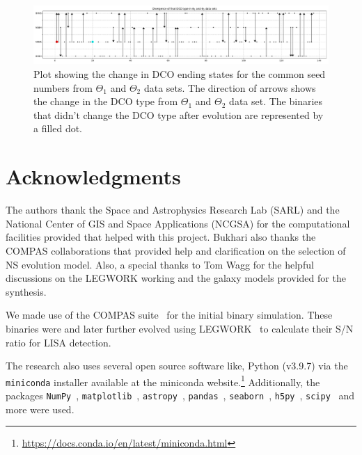 \documentclass[twocolumn, twocolappendix]{aastex63}
\begin{document}
\begin{figure}
	\centering
	\includegraphics[width=\linewidth]{analysis_data/004__images_for_latex/dco_type_divergence_in_two_datasets}
	\caption{Plot showing the change in DCO ending states for the common seed numbers from $\Theta_1$ and $\Theta_2$ data sets. The direction of arrows shows the change in the DCO type from $\Theta_1$ and $\Theta_2$ data set. The binaries that didn't change the DCO type after evolution are represented by a filled dot.}
	\label{fig:dcotypedivergenceintwodatasets}
\end{figure}

\section{Acknowledgments}
\label{sec:acknowledgments}

The authors thank the Space and Astrophysics Research Lab (SARL) and the National Center of GIS and Space Applications (NCGSA) for the computational facilities provided that helped with this project. 
Bukhari also thanks the COMPAS collaborations that provided help and clarification on the selection of NS evolution model. 
Also, a special thanks to Tom Wagg for the helpful discussions on the LEGWORK working and the galaxy models provided for the synthesis.

We made use of the COMPAS suite~\citep{Riley2022} for the initial binary simulation. 
These binaries were and later further evolved using LEGWORK~\citep{Wagg2021LW} to calculate their S/N ratio for LISA detection.

The research also uses several open source software like, Python (v3.9.7) via the \texttt{miniconda} installer available at the miniconda website.\footnote{\url{https://docs.conda.io/en/latest/miniconda.html}}
Additionally, the packages \texttt{NumPy}~\citep{Numpy2020}, \texttt{matplotlib}~\citep{Matplotlib2005, Matplotlib2007}, \texttt{astropy}~\citep{Astropy2013}, \texttt{pandas}~\citep{Pandas2021}, \texttt{seaborn}~\citep{Seaborn2021}, \texttt{h5py}~\citep{H5py2018, H5py2021}, \texttt{scipy}~\citep{Scipy2020} and more were used.


\clearpage
\appendix





\clearpage
\newpage
{}

\end{document}
